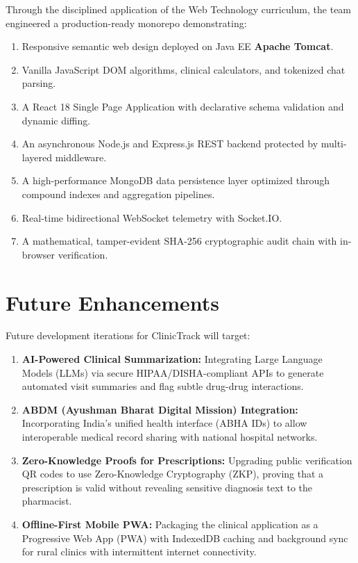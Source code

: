 \documentclass[12pt,a4paper,oneside]{report}
\begin{document}
Through the disciplined application of the Web Technology curriculum, the team engineered a production-ready monorepo demonstrating:
\begin{enumerate}
    \item Responsive semantic web design deployed on Java EE \textbf{Apache Tomcat}.
    \item Vanilla JavaScript DOM algorithms, clinical calculators, and tokenized chat parsing.
    \item A React 18 Single Page Application with declarative schema validation and dynamic diffing.
    \item An asynchronous Node.js and Express.js REST backend protected by multi-layered middleware.
    \item A high-performance MongoDB data persistence layer optimized through compound indexes and aggregation pipelines.
    \item Real-time bidirectional WebSocket telemetry with Socket.IO.
    \item A mathematical, tamper-evident SHA-256 cryptographic audit chain with in-browser verification.
\end{enumerate}

\section{Future Enhancements}
Future development iterations for ClinicTrack will target:
\begin{enumerate}
    \item \textbf{AI-Powered Clinical Summarization:} Integrating Large Language Models (LLMs) via secure HIPAA/DISHA-compliant APIs to generate automated visit summaries and flag subtle drug-drug interactions.
    \item \textbf{ABDM (Ayushman Bharat Digital Mission) Integration:} Incorporating India's unified health interface (ABHA IDs) to allow interoperable medical record sharing with national hospital networks.
    \item \textbf{Zero-Knowledge Proofs for Prescriptions:} Upgrading public verification QR codes to use Zero-Knowledge Cryptography (ZKP), proving that a prescription is valid without revealing sensitive diagnosis text to the pharmacist.
    \item \textbf{Offline-First Mobile PWA:} Packaging the clinical application as a Progressive Web App (PWA) with IndexedDB caching and background sync for rural clinics with intermittent internet connectivity.
\end{enumerate}
\end{document}
